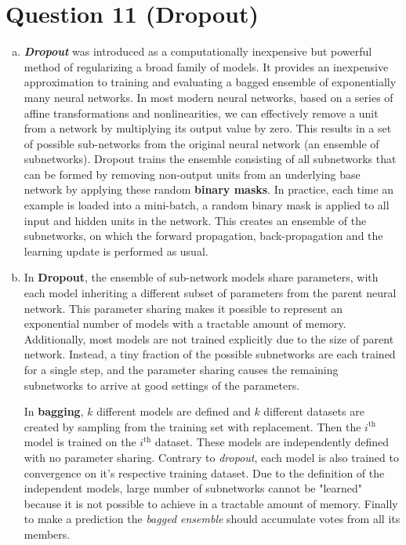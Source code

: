 \documentclass[fleqn]{article}
\begin{document}
\section*{Question 11 (Dropout)}
\begin{enumerate}[a)]
	\item
	\textit{\textbf{Dropout}} was introduced as a computationally inexpensive but powerful method of regularizing a broad family of models. It provides an inexpensive approximation to training and evaluating a bagged ensemble of exponentially many neural networks. In most modern neural networks, based on a series of affine transformations and nonlinearities, we can effectively remove a unit from a network by multiplying its output value by zero. This results in a set of possible sub-networks from the original neural network (an ensemble of subnetworks). Dropout trains the ensemble consisting of all subnetworks that can be formed by removing non-output units from an underlying base network by applying these random \textbf{binary masks}. In practice, each time an example  is loaded into a mini-batch, a random binary mask is applied to all input and hidden units in the network. This creates an ensemble of the subnetworks, on which the forward propagation, back-propagation and the learning update is performed as usual.
	
	\item
	In \textbf{Dropout}, the ensemble of sub-network models share parameters, with each model inheriting a different subset of parameters from the parent neural network. This parameter sharing makes it possible to represent an exponential number of models with a tractable amount of memory. Additionally, most models are not trained explicitly due to the size of parent network. Instead, a tiny fraction of the possible subnetworks are each trained for a single step, and the parameter sharing causes the remaining subnetworks to arrive at good settings of the parameters. \hfill \break
	
	In \textbf{bagging}, $k$ different models are defined and $k$ different datasets  are created by  sampling from the training set with replacement. Then the $i^{\text{th}}$ model is trained on the $i^{\text{th}}$ dataset. These models are independently defined with no parameter sharing. Contrary to \textit{dropout}, each model is also trained to convergence on it's respective training dataset. Due to the definition of the independent models, large number of subnetworks cannot be "learned" because it is not possible to achieve in a tractable amount of memory. Finally to make a prediction the \textit{bagged ensemble} should accumulate votes from all its members.
	
\end{enumerate}
\end{document}
